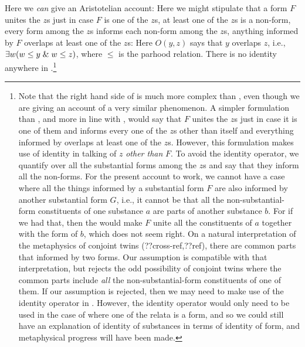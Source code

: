 Here we \textit{can} give an Aristotelian account:
Here we might stipulate that a form $F$ unites the $z$s just in case $F$ is one of 
the $z$s, at least one of the $z$s is a non-form, every form among the $z$s informs 
each non-form among the $z$s, anything informed  by $F$ overlaps at least one of the $z$s:
Here $O(y,z)$ says that $y$ overlaps $z$,
i.e., $\exists w(w\le y\mathrel{\&} w\le z)$, where $\le$ is the parhood
relation. There is no identity anywhere in .\footnote{Note that the right hand side of 
 is much more complex than , even though we are giving an account of a 
very similar phenomenon. A simpler formulation than , and more in line with , 
would say that $F$ unites the $z$s just in case it is one of them and informs every one of the $z$s other 
than itself and everything informed by overlaps at least one of the $z$s. However, this formulation 
makes use of identity in talking of $z$ \textit{other than} $F$. To avoid the identity operator, we 
quantify over all the substantial forms among the $z$s and say that they inform all the non-forms. 
For the present account to work, we cannot have a case where all the things informed by a substantial
form $F$ are also informed by another substantial form $G$, i.e., it cannot be that all the non-substantial-form 
constituents of one substance $a$ are parts of another substance $b$. For if we had that, then the 
 would make $F$ unite all the constituents of $a$ together with the form of $b$, which does not
seem right. On a natural interpretation of the metaphysics of conjoint twins (??cross-ref,??ref), there are common
parts that informed by two forms. Our assumption is compatible with that interpretation, but rejects the odd
possibility of conjoint twins where the common parts include \textit{all} the non-substantial-form constituents
of one of them. If our assumption is rejected, then we may need to make use of the identity operator in .
However, the identity operator would only need to be used in the case of where one of the relata is a form, and so 
we could still have an explanation of identity of substances in terms of identity of form, and metaphysical
progress will have been made.}

